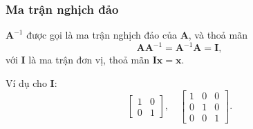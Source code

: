\begin{frame}
    \frametitle{Ma trận nghịch đảo}
    \begin{tcolorbox}[colback=blue!10, colframe=blue!50!black, title=Định nghĩa]
        \(\mathbf{A}^{-1}\) được gọi là ma trận nghịch đảo của \(\mathbf{A}\), và thoả mãn
        \[\mathbf{A}\mathbf{A}^{-1}=\mathbf{A}^{-1}\mathbf{A}=\mathbf{I},\] với \(\mathbf{I}\) là ma trận đơn vị, thoả mãn \(\mathbf{I}\mathbf{x}=\mathbf{x}\).
    \end{tcolorbox}
Ví dụ cho \(\mathbf{I}\):
\[\begin{bmatrix}
    1&0\\
    0&1
\end{bmatrix},\quad
\begin{bmatrix}
    1&0&0\\
    0&1&0\\
    0&0&1
\end{bmatrix}.\]
\end{frame}
